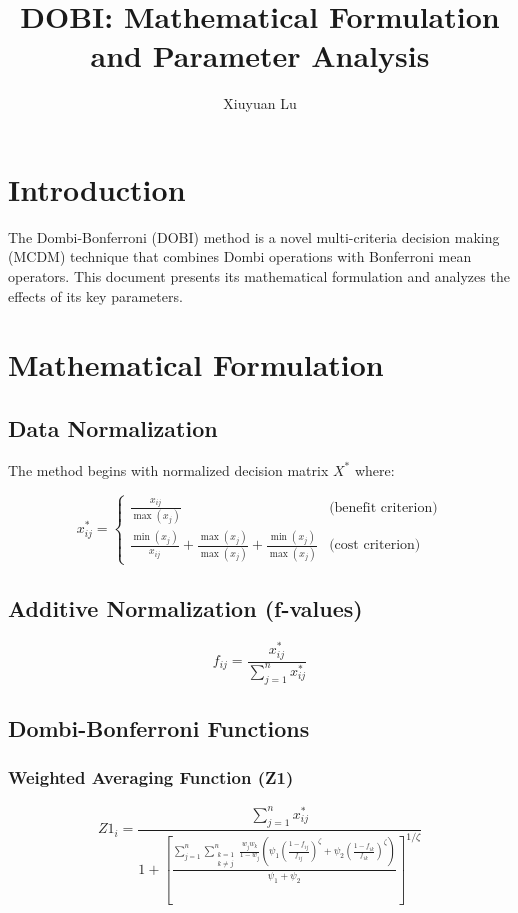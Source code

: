 \documentclass{article}
\title{DOBI: Mathematical Formulation and Parameter Analysis}
\author{Xiuyuan Lu}
\date{}
\begin{document}
\maketitle

\section{Introduction}
The Dombi-Bonferroni (DOBI) method is a novel multi-criteria decision making (MCDM) technique that combines Dombi operations with Bonferroni mean operators. This document presents its mathematical formulation and analyzes the effects of its key parameters.

\section{Mathematical Formulation}

\subsection{Data Normalization}
The method begins with normalized decision matrix $X^*$ where:

\begin{equation}
x_{ij}^* = 
\begin{cases}
\frac{x_{ij}}{\max(x_j)} & \text{(benefit criterion)} \\
\frac{\min(x_j)}{x_{ij}} + \frac{\max(x_j)}{\max(x_j)} + \frac{\min(x_j)}{\max(x_j)} & \text{(cost criterion)}
\end{cases}
\end{equation}

\subsection{Additive Normalization (f-values)}
\begin{equation}
f_{ij} = \frac{x_{ij}^*}{\sum_{j=1}^n x_{ij}^*}
\end{equation}

\subsection{Dombi-Bonferroni Functions}

\subsubsection{Weighted Averaging Function (Z1)}
\begin{equation}
Z1_i = \frac{\sum_{j=1}^n x_{ij}^*}{1 + \left[\frac{\sum_{j=1}^n \sum_{\substack{k=1 \\ k \neq j}}^n \frac{w_j w_k}{1-w_j} \left(\psi_1 \left(\frac{1-f_{ij}}{f_{ij}}\right)^\zeta + \psi_2 \left(\frac{1-f_{ik}}{f_{ik}}\right)^\zeta\right)}{\psi_1 + \psi_2}\right]^{1/\zeta}}
\end{equation}
\end{document}
